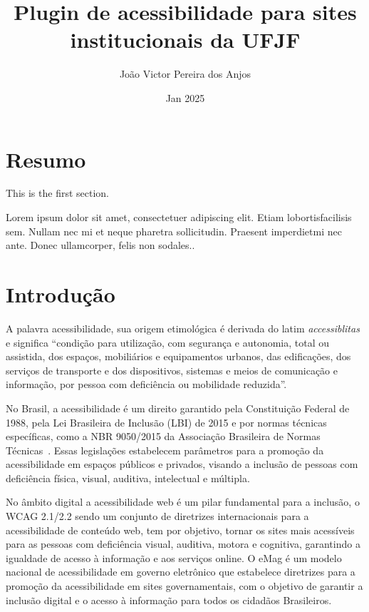 \documentclass[12pt]{article}
\title{Plugin de acessibilidade para sites institucionais da UFJF}
\author{João Victor Pereira dos Anjos}
\date{Jan 2025}
\begin{document}
\maketitle

\tableofcontents

\section{Resumo}

This is the first section.

Lorem  ipsum  dolor  sit  amet,  consectetuer  adipiscing
elit.   Etiam  lobortisfacilisis sem.  Nullam nec mi et
neque pharetra sollicitudin.  Praesent imperdietmi nec ante.
Donec ullamcorper, felis non sodales..

\section{Introdução}

A palavra acessibilidade, sua origem etimológica é derivada do latim \textit{accessiblitas}
e significa ``condição para utilização, com segurança e autonomia,
total ou assistida, dos espaços, mobiliários e equipamentos urbanos, das
edificações, dos serviços de transporte e dos dispositivos, sistemas e meios de
comunicação e informação, por pessoa com deficiência ou mobilidade reduzida''\cite{Acessibilidade}.

No Brasil, a acessibilidade é um direito garantido pela Constituição
Federal de 1988, pela Lei Brasileira de Inclusão (LBI) de 2015 \Cite{LBI}
e por normas técnicas específicas, como a NBR 9050/2015 da Associação
Brasileira de Normas Técnicas~\cite{ABNT}. Essas legislações estabelecem
parâmetros para a promoção da acessibilidade em espaços públicos e privados,
visando a inclusão de pessoas com deficiência física, visual, auditiva,
intelectual e múltipla.

No âmbito digital a acessibilidade web é um pilar fundamental para a
inclusão, o WCAG 2.1/2.2 \autocite{wcag22} sendo um conjunto de diretrizes
internacionais para a acessibilidade de conteúdo web, tem por objetivo,
tornar os sites mais acessíveis para as pessoas com deficiência visual, auditiva,
motora e cognitiva, garantindo a igualdade de acesso à informação e aos
serviços online. O eMag é um modelo nacional de acessibilidade em governo
eletrônico que estabelece diretrizes para a promoção da acessibilidade em
sites governamentais, com o objetivo de garantir a inclusão digital e o acesso
à informação para todos os cidadãos Brasileiros.
\end{document}
